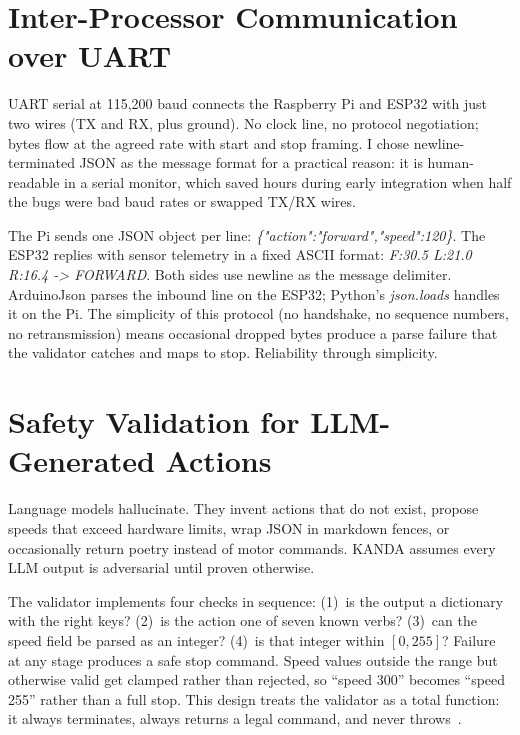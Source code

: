 \section{Inter-Processor Communication over UART}
\label{sec:uart}

UART serial at 115,200 baud connects the Raspberry Pi and ESP32 with just two wires (TX and RX, plus ground). No clock line, no protocol negotiation; bytes flow at the agreed rate with start and stop framing. I chose newline-terminated JSON as the message format for a practical reason: it is human-readable in a serial monitor, which saved hours during early integration when half the bugs were bad baud rates or swapped TX/RX wires.


The Pi sends one JSON object per line: \textit{\{"action":"forward","speed":120\}}. The ESP32 replies with sensor telemetry in a fixed ASCII format: \textit{F:30.5 L:21.0 R:16.4 -> FORWARD}. Both sides use newline as the message delimiter. ArduinoJson parses the inbound line on the ESP32; Python's \textit{json.loads} handles it on the Pi. The simplicity of this protocol (no handshake, no sequence numbers, no retransmission) means occasional dropped bytes produce a parse failure that the validator catches and maps to stop. Reliability through simplicity.

\section{Safety Validation for LLM-Generated Actions}
\label{sec:safety_theory}

Language models hallucinate. They invent actions that do not exist, propose speeds that exceed hardware limits, wrap JSON in markdown fences, or occasionally return poetry instead of motor commands. KANDA assumes every LLM output is adversarial until proven otherwise.

The validator implements four checks in sequence: (1)~is the output a dictionary with the right keys? (2)~is the action one of seven known verbs? (3)~can the speed field be parsed as an integer? (4)~is that integer within $[0,255]$? Failure at any stage produces a safe stop command. Speed values outside the range but otherwise valid get clamped rather than rejected, so ``speed 300'' becomes ``speed 255'' rather than a full stop. This design treats the validator as a total function: it always terminates, always returns a legal command, and never throws~\cite{huang2023grounded,ahn2022saycan}.

